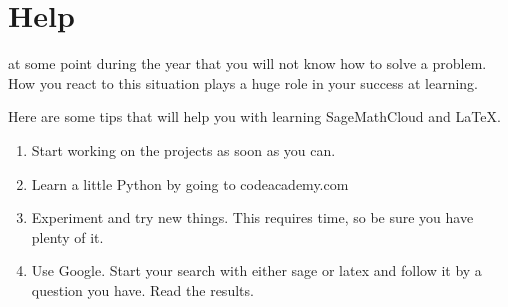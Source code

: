 \documentclass
[justified,nohyper]
{tufte-handout}
\begin{document}
\section{Help}

 at some point during the year that you will not know how to solve a problem. How you react to this situation plays a huge role in your success at learning.

Here are some tips that will help you with learning SageMathCloud and \LaTeX.

\begin{enumerate}
  \item Start working on the projects as soon as you can.
  \item Learn a little Python by going to codeacademy.com
  \item Experiment and try new things. This requires time, so be sure you have plenty of it.
  \item Use Google. Start your search with either sage or latex and follow it by a question you have. Read the results.
\end{enumerate}
\end{document}
